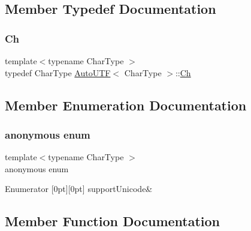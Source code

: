 \subsection{Member Typedef Documentation}
\mbox{\label{structAutoUTF_a0609343de776df3bc31b4c980eb3cf1c}} 
\subsubsection{\texorpdfstring{Ch}{Ch}}
{\footnotesize\ttfamily template$<$typename Char\+Type $>$ \\
typedef Char\+Type \hyperlink{structAutoUTF}{Auto\+U\+TF}$<$ Char\+Type $>$\+::\hyperlink{structAutoUTF_a0609343de776df3bc31b4c980eb3cf1c}{Ch}}



\subsection{Member Enumeration Documentation}
\mbox{\label{structAutoUTF_ac046404cf4770f29218ada39f6b652d3}} 
\subsubsection{\texorpdfstring{anonymous enum}{anonymous enum}}
{\footnotesize\ttfamily template$<$typename Char\+Type $>$ \\
anonymous enum}

\begin{DoxyEnumFields}{Enumerator}
[0pt][0pt]{}\mbox{\label{structAutoUTF_ac046404cf4770f29218ada39f6b652d3adc86ae046cd64f591495ac635a5c04c2}} 
support\+Unicode&\\
\hline

\end{DoxyEnumFields}


\subsection{Member Function Documentation}
\mbox{\label{structAutoUTF_aa5e3c1dc23dbb75f6442ff69500a35b0}} 
